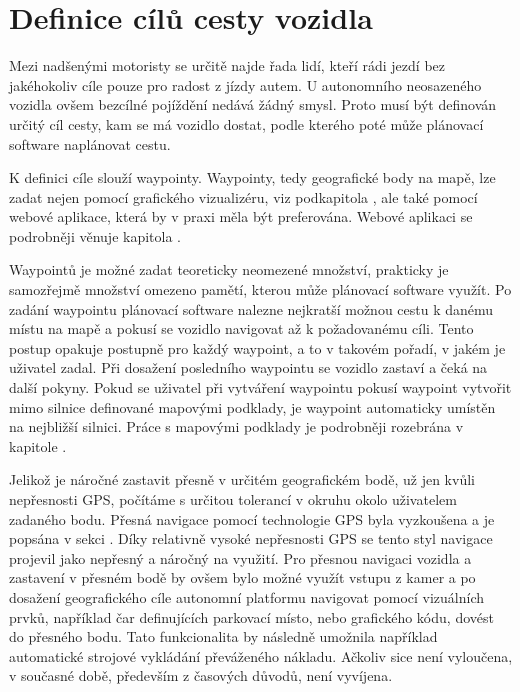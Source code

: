 \documentclass[czech, bachelor]{diploma}
\begin{document}
\section{Definice cílů cesty vozidla} \label{target-definition}

Mezi nadšenými motoristy se určitě najde řada lidí, kteří rádi jezdí bez jakéhokoliv cíle pouze pro radost z jízdy autem.
U autonomního neosazeného vozidla ovšem bezcílné pojíždění nedává žádný smysl. Proto musí být definován určitý cíl cesty, kam
se má vozidlo dostat, podle kterého poté může plánovací software naplánovat cestu.

K definici cíle slouží waypointy. Waypointy, tedy geografické body na mapě, lze zadat nejen pomocí grafického vizualizéru,
viz podkapitola , ale také pomocí webové aplikace, která by v praxi měla být preferována. Webové aplikaci
se podrobněji věnuje kapitola .

Waypointů je možné zadat teoreticky neomezené množství, prakticky je samozřejmě množství omezeno pamětí, kterou může plánovací
software využít.  Po zadání waypointu plánovací software nalezne nejkratší možnou cestu k danému místu na mapě a pokusí se vozidlo
navigovat až k požadovanému cíli. Tento postup opakuje postupně pro každý waypoint, a to v takovém pořadí, v jakém je uživatel
zadal. Při dosažení posledního waypointu se vozidlo zastaví a čeká na další pokyny. Pokud se uživatel při vytváření waypointu
pokusí waypoint vytvořit mimo silnice definované mapovými podklady, je waypoint automaticky umístěn na nejbližší silnici.
Práce s mapovými podklady je podrobněji rozebrána v kapitole .

Jelikož je náročné zastavit přesně v určitém geografickém bodě, už jen kvůli nepřesnosti GPS, počítáme s určitou tolerancí
v okruhu okolo uživatelem zadaného bodu. Přesná navigace pomocí technologie GPS byla vyzkoušena a je popsána v sekci
. Díky relativně vysoké nepřesnosti GPS se tento styl navigace projevil jako nepřesný a náročný na využití.
Pro přesnou navigaci vozidla a zastavení v přesném bodě by ovšem bylo možné využít vstupu z kamer a po dosažení geografického cíle
autonomní platformu navigovat pomocí vizuálních prvků, například čar definujících parkovací místo, nebo grafického kódu, dovést
do přesného bodu. Tato funkcionalita by následně umožnila například automatické strojové vykládání převáženého nákladu. Ačkoliv
sice není vyloučena, v současné době, především z časových důvodů, není vyvíjena.
\end{document}
